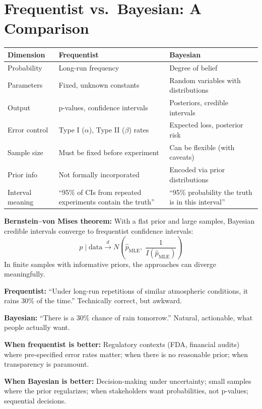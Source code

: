 \documentclass[11pt,a4paper]{article}
\begin{document}
\section{Frequentist vs.\ Bayesian: A Comparison}

\begin{formaldef}
\begin{tabular}{@{}p{3cm}p{5.5cm}p{5.5cm}@{}}
\toprule
\textbf{Dimension} & \textbf{Frequentist} & \textbf{Bayesian} \\
\midrule
Probability & Long-run frequency & Degree of belief \\
Parameters & Fixed, unknown constants & Random variables with distributions \\
Output & p-values, confidence intervals & Posteriors, credible intervals \\
Error control & Type I ($\alpha$), Type II ($\beta$) rates & Expected loss, posterior risk \\
Sample size & Must be fixed before experiment & Can be flexible (with caveats) \\
Prior info & Not formally incorporated & Encoded via prior distributions \\
Interval meaning & ``95\% of CIs from repeated experiments contain the truth'' & ``95\% probability the truth is in this interval'' \\
\bottomrule
\end{tabular}

\medskip
\textbf{Bernstein--von Mises theorem:} With a flat prior and large samples, Bayesian credible intervals converge to frequentist confidence intervals:
\[
p \mid \text{data} \xrightarrow{d} N\!\left(\hat{p}_{\mathrm{MLE}}, \; \frac{1}{I(\hat{p}_{\mathrm{MLE}})}\right)
\]
In finite samples with informative priors, the approaches can diverge meaningfully.
\end{formaldef}

\vspace{8pt}

\begin{intuition}
\textbf{Frequentist:} ``Under long-run repetitions of similar atmospheric conditions, it rains 30\% of the time.'' Technically correct, but awkward.

\textbf{Bayesian:} ``There is a 30\% chance of rain tomorrow.'' Natural, actionable, what people actually want.

\medskip
\textbf{When frequentist is better:} Regulatory contexts (FDA, financial audits) where pre-specified error rates matter; when there is no reasonable prior; when transparency is paramount.

\textbf{When Bayesian is better:} Decision-making under uncertainty; small samples where the prior regularizes; when stakeholders want probabilities, not p-values; sequential decisions.
\end{intuition}
\end{document}
